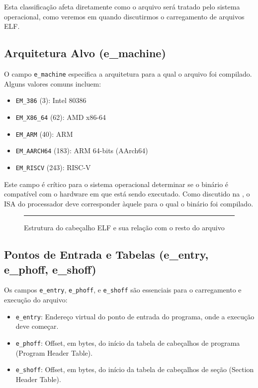 Esta classificação afeta diretamente como o arquivo será tratado pelo sistema operacional, como veremos em  quando discutirmos o carregamento de arquivos ELF.

\subsection{Arquitetura Alvo (e\_machine)}\label{subsec:e_machine}

O campo \texttt{e\_machine} especifica a arquitetura para a qual o arquivo foi compilado. Alguns valores comuns incluem:

\begin{itemize}
    \item \texttt{EM\_386} (3): Intel 80386
    \item \texttt{EM\_X86\_64} (62): AMD x86-64
    \item \texttt{EM\_ARM} (40): ARM
    \item \texttt{EM\_AARCH64} (183): ARM 64-bits (AArch64)
    \item \texttt{EM\_RISCV} (243): RISC-V
\end{itemize}

Este campo é crítico para o sistema operacional determinar se o binário é compatível com o hardware em que está sendo executado. Como discutido na , o ISA do processador deve corresponder àquele para o qual o binário foi compilado.

\begin{figure}[ht]
    \centering
    \rule{10cm}{6cm} %
    \caption{Estrutura do cabeçalho ELF e sua relação com o resto do arquivo}
    \label{fig:elf_header_structure}
\end{figure}

\subsection{Pontos de Entrada e Tabelas (e\_entry, e\_phoff, e\_shoff)}\label{subsec:entry_points}

Os campos \texttt{e\_entry}, \texttt{e\_phoff}, e \texttt{e\_shoff} são essenciais para o carregamento e execução do arquivo:

\begin{itemize}
    \item \texttt{e\_entry}: Endereço virtual do ponto de entrada do programa, onde a execução deve começar.
    \item \texttt{e\_phoff}: Offset, em bytes, do início da tabela de cabeçalhos de programa (Program Header Table).
    \item \texttt{e\_shoff}: Offset, em bytes, do início da tabela de cabeçalhos de seção (Section Header Table).
\end{itemize}

